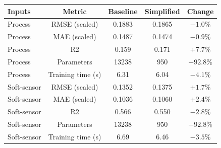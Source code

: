 \begin{tabular}{lcccc}
\hline
Inputs & Metric & Baseline & Simplified & Change \\
\hline
Process & RMSE (scaled) & 0.1883 & 0.1865 & $-1.0$\% \\
Process & MAE (scaled) & 0.1487 & 0.1474 & $-0.9$\% \\
Process & R2 & 0.159 & 0.171 & $+7.7$\% \\
Process & Parameters & 13238 & 950 & $-92.8$\% \\
Process & Training time (s) & 6.31 & 6.04 & $-4.1$\% \\
\hline
Soft-sensor & RMSE (scaled) & 0.1352 & 0.1375 & $+1.7$\% \\
Soft-sensor & MAE (scaled) & 0.1036 & 0.1060 & $+2.4$\% \\
Soft-sensor & R2 & 0.566 & 0.550 & $-2.8$\% \\
Soft-sensor & Parameters & 13238 & 950 & $-92.8$\% \\
Soft-sensor & Training time (s) & 6.69 & 6.46 & $-3.5$\% \\
\hline
\end{tabular}
